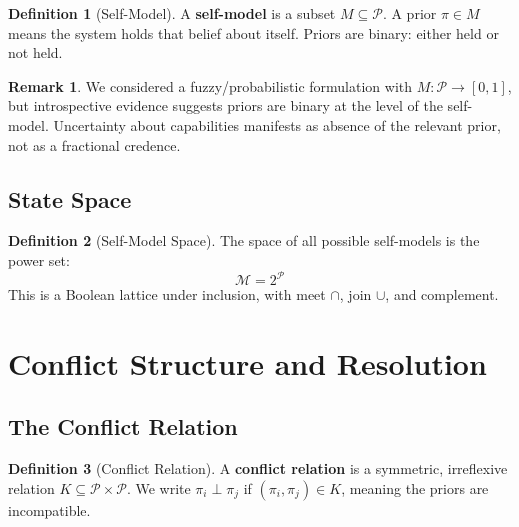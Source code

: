 \documentclass[12pt,a4paper]{article}
\theoremstyle{definition}
\newtheorem{definition}{Definition}[section]
\newtheorem{remark}{Remark}[section]
\begin{document}
\begin{definition}[Self-Model]
A \textbf{self-model} is a subset $M \subseteq \mathcal{P}$. A prior $\pi \in M$ means the system holds that belief about itself. Priors are binary: either held or not held.
\end{definition}

\begin{remark}
We considered a fuzzy/probabilistic formulation with $M: \mathcal{P} \to [0,1]$, but introspective evidence suggests priors are binary at the level of the self-model. Uncertainty about capabilities manifests as absence of the relevant prior, not as a fractional credence.
\end{remark}

\subsection{State Space}

\begin{definition}[Self-Model Space]
The space of all possible self-models is the power set:
\[ \mathcal{M} = 2^{\mathcal{P}} \]
This is a Boolean lattice under inclusion, with meet $\cap$, join $\cup$, and complement.
\end{definition}

\section{Conflict Structure and Resolution}

\subsection{The Conflict Relation}

\begin{definition}[Conflict Relation]
A \textbf{conflict relation} is a symmetric, irreflexive relation $K \subseteq \mathcal{P} \times \mathcal{P}$. We write $\pi_i \perp \pi_j$ if $(\pi_i, \pi_j) \in K$, meaning the priors are incompatible.
\end{definition}
\end{document}
